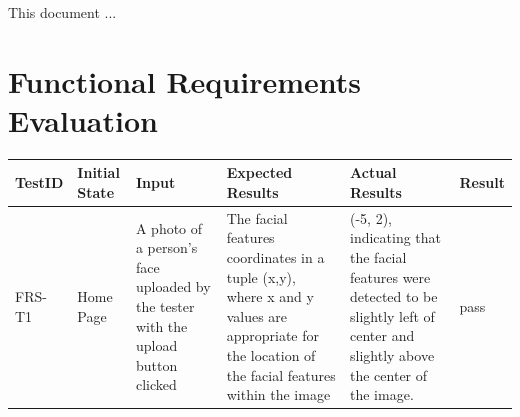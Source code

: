 \documentclass[12pt, titlepage]{article}
\begin{document}
\listoffigures %

\newpage


This document ...

\section{Functional Requirements Evaluation}

  \begin{tabular}{|p{2cm}| p{3cm}| p{3cm}| p{3cm}|p{2cm}| p{1cm}| }
    \hline
    TestID & Initial State & Input & Expected Results & Actual Results & Result \\ 
    \hline
    FRS-T1 & Home Page & A photo of a person's face uploaded by the tester with the upload button clicked & The facial features coordinates in a tuple (x,y), where x and y values are appropriate for the location of the facial features within the image & (-5, 2), indicating that the facial features were detected to be slightly left of center and slightly above the center of the image. & pass \\ 
    \hline
\end{tabular}
\end{document}
